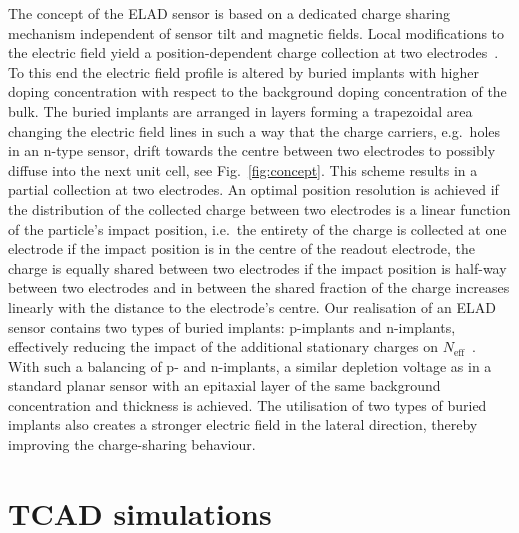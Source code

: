 \documentclass[a4paper,11pt]{article}
\begin{document}
The concept of the ELAD sensor is based on a dedicated charge sharing mechanism independent of sensor tilt and magnetic fields.
Local modifications to the electric field yield a position-dependent charge collection at two electrodes~\cite{hj}.
To this end the electric field profile is altered by buried implants with higher doping concentration with respect to the background doping concentration of the bulk. 
The buried implants are arranged in layers forming a trapezoidal area changing the electric field lines in such a way
 that the charge carriers, e.g.\ holes in an n-type sensor, drift towards the centre between two electrodes to possibly diffuse into the next unit cell, see Fig.~\ref{fig:concept}.
This scheme results in a partial collection at two electrodes.
An optimal position resolution is achieved if the distribution of the collected charge between two electrodes is a linear function of the particle's impact position, 
 i.e.\ the entirety of the charge is collected at one electrode if the impact position is in the centre of the readout electrode,
 the charge is equally shared between two electrodes if the impact position is half-way between two electrodes
 and in between the shared fraction of the charge increases linearly with the distance to the electrode's centre.
Our realisation of an ELAD sensor contains two types of buried implants: p-implants and n-implants, effectively reducing the impact of the additional stationary charges on $N\mathrm{_{eff}}$~\cite{elad}. 
With such a balancing of p- and n-implants, a similar depletion voltage as in a standard planar sensor with an epitaxial layer of the same background concentration and thickness is achieved.
The utilisation of two types of buried implants also creates a stronger electric field in the lateral direction, thereby improving the charge-sharing behaviour.
 

\section{TCAD simulations}
\label{sec:sim}
\end{document}
